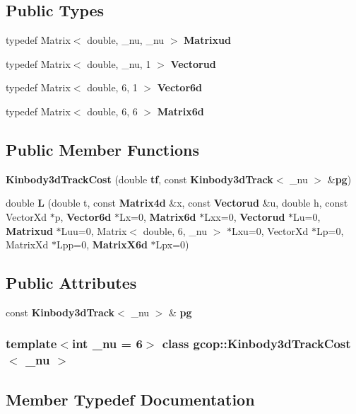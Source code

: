 \subsection*{\-Public \-Types}
\begin{DoxyCompactItemize}
\item 
typedef \-Matrix$<$ double, \-\_\-nu, \-\_\-nu $>$ {\bf \-Matrixud}
\item 
typedef \-Matrix$<$ double, \-\_\-nu, 1 $>$ {\bf \-Vectorud}
\item 
typedef \-Matrix$<$ double, 6, 1 $>$ {\bf \-Vector6d}
\item 
typedef \-Matrix$<$ double, 6, 6 $>$ {\bf \-Matrix6d}
\end{DoxyCompactItemize}
\subsection*{\-Public \-Member \-Functions}
\begin{DoxyCompactItemize}
\item 
{\bf \-Kinbody3d\-Track\-Cost} (double {\bf tf}, const {\bf \-Kinbody3d\-Track}$<$ \-\_\-nu $>$ \&{\bf pg})
\item 
double {\bf \-L} (double t, const {\bf \-Matrix4d} \&x, const {\bf \-Vectorud} \&u, double h, const \-Vector\-Xd $\ast$p, {\bf \-Vector6d} $\ast$\-Lx=0, {\bf \-Matrix6d} $\ast$\-Lxx=0, {\bf \-Vectorud} $\ast$\-Lu=0, {\bf \-Matrixud} $\ast$\-Luu=0, \-Matrix$<$ double, 6, \-\_\-nu $>$ $\ast$\-Lxu=0, \-Vector\-Xd $\ast$\-Lp=0, \-Matrix\-Xd $\ast$\-Lpp=0, {\bf \-Matrix\-X6d} $\ast$\-Lpx=0)
\end{DoxyCompactItemize}
\subsection*{\-Public \-Attributes}
\begin{DoxyCompactItemize}
\item 
const {\bf \-Kinbody3d\-Track}$<$ \-\_\-nu $>$ \& {\bf pg}
\end{DoxyCompactItemize}
\subsubsection*{template$<$int \-\_\-nu = 6$>$ class gcop\-::\-Kinbody3d\-Track\-Cost$<$ \-\_\-nu $>$}



\subsection{\-Member \-Typedef \-Documentation}
